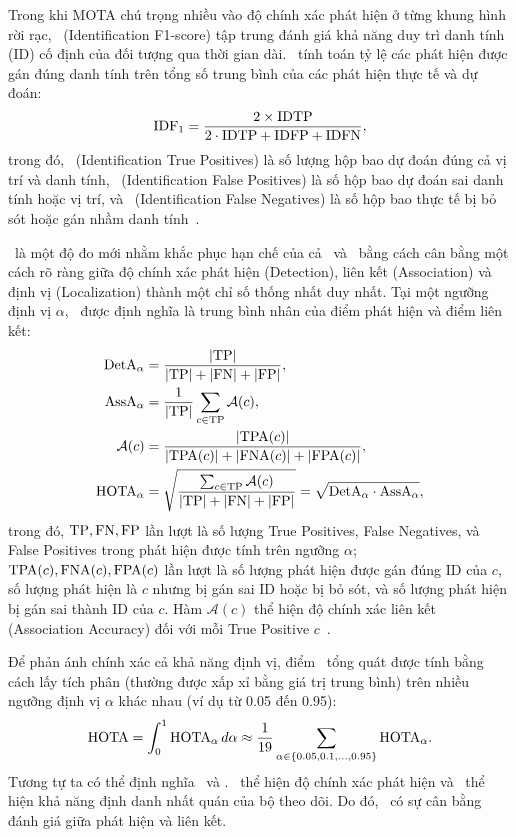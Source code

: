 Trong khi MOTA chú trọng nhiều vào độ chính xác phát hiện ở từng khung hình rời
rạc, \IDFone\ (Identification F1-score) tập trung đánh giá khả năng duy trì
danh tính (ID) cố định của đối tượng qua thời gian dài. \IDFone\ tính toán tỷ
lệ các phát hiện được gán đúng danh tính trên tổng số trung bình của các phát
hiện thực tế và dự đoán: \begin{equation}
  \IDFone = \frac{2 \times \IDTP}{2 \cdot \IDTP + \IDFP + \IDFN},
\end{equation} trong đó, \IDTP\ (Identification True Positives) là số lượng hộp
bao dự đoán đúng cả vị trí và danh tính, \IDFP\ (Identification False
Positives) là số hộp bao dự đoán sai danh tính hoặc vị trí, và \IDFN\
(Identification False Negatives) là số hộp bao thực tế bị bỏ sót hoặc gán nhầm
danh tính~\cite{ristani2016idf1}.

\HOTA\ là một độ đo mới nhằm khắc phục hạn chế của cả \MOTA\ và \IDFone\ bằng
cách cân bằng một cách rõ ràng giữa độ chính xác phát hiện (Detection), liên
kết (Association) và định vị (Localization) thành một chỉ số thống nhất duy
nhất.  Tại một ngưỡng định vị $\alpha$, \HOTA\ được định nghĩa là trung bình
nhân của điểm phát hiện và điểm liên kết: \begin{align}
  \DetA_\alpha &= \frac{\lvert \TP \rvert}{ \lvert \TP \rvert + \lvert \FN
  \rvert + \lvert \FP \rvert }, \\
  \AssA_\alpha &= \frac{1}{\lvert \TP \rvert} \sum_{c \in \TP} \mathcal{A}(c),
  \\
  \mathcal{A}(c) &= \frac{\lvert \TPA(c) \rvert}{ \lvert \TPA(c) \rvert +
  \lvert \FNA(c) \rvert + \lvert \FPA(c) \rvert}, \\
  \HOTA_\alpha &= \sqrt{\frac{\sum_{c \in \TP} \mathcal{A}(c)}{\lvert
  \TP \rvert + \lvert \FN \rvert + \lvert \FP \rvert}} = \sqrt{\DetA_\alpha
  \cdot \AssA_\alpha},
\end{align} trong đó, $\TP, \FN, \FP$ lần lượt là số lượng True Positives,
False Negatives, và False Positives trong phát hiện được tính trên ngưỡng
$\alpha$; $\TPA(c), \FNA(c), \FPA(c)$ lần lượt là số lượng phát hiện được gán
đúng ID của $c$, số lượng phát hiện là $c$ nhưng bị gán sai ID hoặc bị bỏ sót,
và số lượng phát hiện bị gán sai thành ID của $c$. Hàm $\mathcal{A}(c)$ thể
hiện độ chính xác liên kết (Association Accuracy) đối với mỗi True Positive
$c$~\cite{luiten2020hota}.

Để phản ánh chính xác cả khả năng định vị, điểm \HOTA\ tổng quát được tính bằng
cách lấy tích phân (thường được xấp xỉ bằng giá trị trung bình) trên nhiều
ngưỡng định vị $\alpha$ khác nhau (ví dụ từ 0.05 đến 0.95):
\begin{equation}
    \HOTA = \int_0^1 \HOTA_\alpha\, d\alpha \approx \frac{1}{19} \sum_{\alpha
    \in \{0.05, 0.1, \dots, 0.95\}} \HOTA_\alpha.
\end{equation} Tương tự ta có thể định nghĩa \DetA\ và \AssA. \DetA\ thể hiện
độ chính xác phát hiện và \AssA\ thể hiện khả năng định danh nhất quán của bộ
theo dõi. Do đó, \HOTA\ có sự cân bằng đánh giá giữa phát hiện và liên kết.
